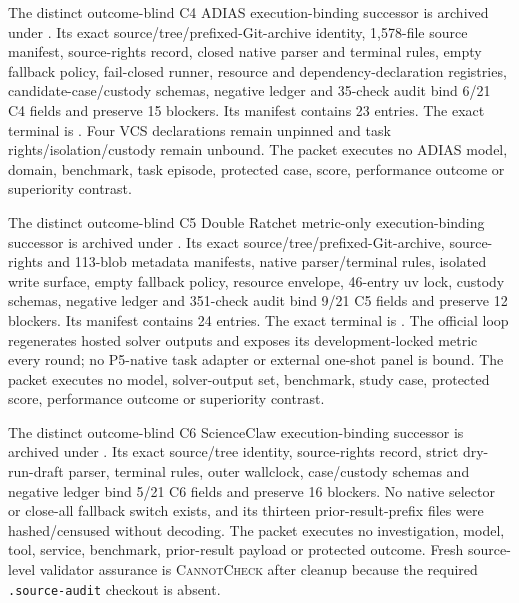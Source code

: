 The distinct outcome-blind C4 ADIAS execution-binding successor is archived
under . Its exact
source/tree/prefixed-Git-archive identity, 1,578-file source manifest,
source-rights record, closed native parser and terminal rules, empty fallback
policy, fail-closed runner, resource and dependency-declaration registries,
candidate-case/custody schemas, negative ledger and 35-check audit bind 6/21 C4
fields and preserve 15 blockers. Its manifest contains 23 entries. The exact
terminal is
.
Four VCS declarations remain unpinned and task rights/isolation/custody remain
unbound. The packet executes no ADIAS model, domain, benchmark, task episode,
protected case, score, performance outcome or superiority contrast.

The distinct outcome-blind C5 Double Ratchet metric-only execution-binding
successor is archived under
. Its exact
source/tree/prefixed-Git-archive, source-rights and 113-blob metadata manifests,
native parser/terminal rules, isolated write surface, empty fallback policy,
resource envelope, 46-entry uv lock, custody schemas, negative ledger and
351-check audit bind 9/21 C5 fields and preserve 12 blockers. Its manifest
contains 24 entries. The exact terminal is
.
The official loop regenerates hosted solver outputs and exposes its
development-locked metric every round; no P5-native task adapter or external
one-shot panel is bound. The packet executes no model, solver-output set,
benchmark, study case, protected score, performance outcome or superiority
contrast.

The distinct outcome-blind C6 ScienceClaw execution-binding successor is
archived under
. Its exact
source/tree identity, source-rights record, strict dry-run-draft parser,
terminal rules, outer wallclock, case/custody schemas and negative ledger bind
5/21 C6 fields and preserve 16 blockers. No native selector or close-all
fallback switch exists, and its thirteen prior-result-prefix files were
hashed/censused without decoding. The packet executes no investigation, model,
tool, service, benchmark, prior-result payload or protected outcome. Fresh
source-level validator assurance is \textsc{CannotCheck} after cleanup because
the required \texttt{.source-audit} checkout is absent.

